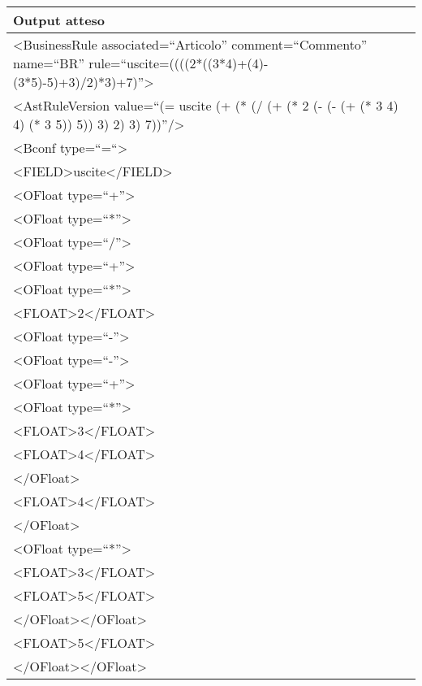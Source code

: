 \begin{center}
\begin{tabular}{|p{11cm}|} \hline
\textbf{Output atteso}\\ \hline
\textless BusinessRule associated=``Articolo'' comment=``Commento'' name=``BR'' rule=``uscite=((((2*((3*4)+(4)-(3*5)-5)+3)/2)*3)+7)''\textgreater\\
 \textless AstRuleVersion value=``(= uscite (+ (* (/ (+ (* 2 (- (- (+ (* 3 4) 4) (* 3 5)) 5)) 3) 2) 3) 7))''/\textgreater\\
 \textless Bconf type=``=``\textgreater \\
\textless FIELD\textgreater uscite\textless /FIELD\textgreater\\
 \textless OFloat type=``+''\textgreater\\
 \textless OFloat type=``*''\textgreater \\
\textless OFloat type=``/''\textgreater \\
\textless OFloat type=``+''\textgreater \\
\textless OFloat type=``*''\textgreater \\
\textless FLOAT\textgreater 2\textless /FLOAT\textgreater \\
\textless OFloat type=``-''\textgreater \\
\textless OFloat type=``-''\textgreater \\
\textless OFloat type=``+''\textgreater\\
 \textless OFloat type=``*''\textgreater \\
\textless FLOAT\textgreater 3\textless /FLOAT\textgreater \\
\textless FLOAT\textgreater 4\textless /FLOAT\textgreater \\
\textless /OFloat\textgreater \\
\textless FLOAT\textgreater 4\textless /FLOAT\textgreater \\
\textless /OFloat\textgreater \\
\textless OFloat type=``*''\textgreater \\
\textless FLOAT\textgreater 3\textless /FLOAT\textgreater \\
\textless FLOAT\textgreater 5\textless /FLOAT\textgreater \\
\textless /OFloat\textgreater \textless /OFloat\textgreater \\
\textless FLOAT\textgreater 5\textless /FLOAT\textgreater \\
\textless /OFloat\textgreater \textless /OFloat\textgreater \\

\end{tabular}
\end{center}
